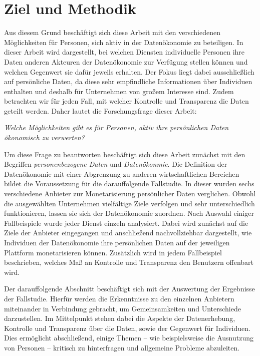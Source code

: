 \section{Ziel und Methodik}
Aus diesem Grund beschäftigt sich diese Arbeit mit den verschiedenen Möglichkeiten für Personen, sich aktiv in der Datenökonomie zu beteiligen. In dieser Arbeit wird dargestellt, bei welchen Diensten individuelle Personen ihre Daten anderen Akteuren der Datenökonomie zur Verfügung stellen können und welchen Gegenwert sie dafür jeweils erhalten. Der Fokus liegt dabei ausschließlich auf persönliche Daten, da diese sehr empfindliche Informationen über Individuen enthalten und deshalb für Unternehmen von großem Interesse sind. Zudem betrachten wir für jeden Fall, mit welcher Kontrolle und Transparenz die Daten geteilt werden. Daher lautet die Forschungsfrage dieser Arbeit:

\begin{center}
\textit{Welche Möglichkeiten gibt es für Personen, aktiv ihre persönlichen Daten ökonomisch zu verwerten?}
\end{center}

\noindent Um diese Frage zu beantworten beschäftigt sich diese Arbeit zunächst mit den Begriffen \textit{personenbezogene Daten} und \textit{Datenökonmie}. Die Definition der Datenökonomie mit einer Abgrenzung zu anderen wirtschaftlichen Bereichen bildet die Voraussetzung für die darauffolgende Fallstudie. In dieser wurden sechs verschiedene Anbieter zur Monetarisierung persönlicher Daten verglichen. Obwohl die ausgewählten Unternehmen vielfältige Ziele verfolgen und sehr unterschiedlich funktionieren, lassen sie sich der Datenökonomie zuordnen. Nach Auswahl einiger Fallbeispiele wurde jeder Dienst einzeln analysiert. Dabei wird zunächst auf die Ziele der Anbieter eingegangen und anschließend nachvollziehbar dargestellt, wie Individuen der Datenökonomie ihre persönlichen Daten auf der jeweiligen Plattform monetarisieren können. Zusätzlich wird in jedem Fallbeispiel beschrieben, welches Maß an Kontrolle und Transparenz den Benutzern offenbart wird. \newline

\noindent Der darauffolgende Abschnitt beschäftigt sich mit der Auswertung der Ergebnisse der Fallstudie. Hierfür werden die Erkenntnisse zu den einzelnen Anbietern miteinander in Verbindung gebracht, um Gemeinsamkeiten und Unterschiede darzustellen. Im Mittelpunkt stehen dabei die Aspekte der Datenerhebung, Kontrolle und Transparenz über die Daten, sowie der Gegenwert für Individuen. Dies ermöglicht abschließend, einige Themen -- wie beispielsweise die Ausnutzung von Personen -- kritisch zu hinterfragen und allgemeine Probleme abzuleiten.
